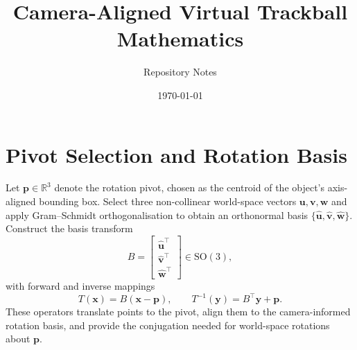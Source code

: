 \documentclass[11pt]{article}
\title{Camera-Aligned Virtual Trackball Mathematics}
\author{Repository Notes}
\date{\today}
\begin{document}
\maketitle

\section{Pivot Selection and Rotation Basis}
Let $\mathbf{p} \in \mathbb{R}^3$ denote the rotation pivot, chosen as the centroid of the object's axis-aligned bounding box. Select three non-collinear world-space vectors $\mathbf{u}, \mathbf{v}, \mathbf{w}$ and apply Gram--Schmidt orthogonalisation to obtain an orthonormal basis $\{\hat{\mathbf{u}}, \hat{\mathbf{v}}, \hat{\mathbf{w}}\}$. Construct the basis transform
\begin{equation}
    B =
    \begin{bmatrix}
        \hat{\mathbf{u}}^{\top}\\
        \hat{\mathbf{v}}^{\top}\\
        \hat{\mathbf{w}}^{\top}
    \end{bmatrix} \in \mathrm{SO}(3),
\end{equation}
with forward and inverse mappings
\begin{equation}
    T(\mathbf{x}) = B(\mathbf{x} - \mathbf{p}), \qquad
    T^{-1}(\mathbf{y}) = B^{\top}\mathbf{y} + \mathbf{p}.
\end{equation}
These operators translate points to the pivot, align them to the camera-informed rotation basis, and provide the conjugation needed for world-space rotations about $\mathbf{p}$.
\end{document}
